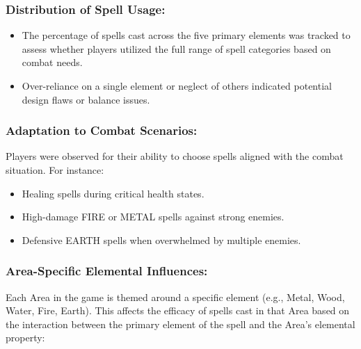 \documentclass[10pt,twocolumn]{article}
\begin{document}
\subsubsection{Distribution of Spell Usage:}

\begin{itemize}
    \item The percentage of spells cast across the five primary elements was tracked to assess whether players utilized the full range of spell categories based on combat needs.
    \item Over-reliance on a single element or neglect of others indicated potential design flaws or balance issues.
\end{itemize}

\subsubsection{Adaptation to Combat Scenarios:}
Players were observed for their ability to choose spells aligned with the combat situation. For instance:
\begin{itemize}
    \item Healing spells during critical health states.
    \item High-damage FIRE or METAL spells against strong enemies.
    \item Defensive EARTH spells when overwhelmed by multiple enemies.
\end{itemize}

\subsubsection{Area-Specific Elemental Influences:}
Each Area in the game is themed around a specific element (e.g., Metal, Wood, Water, Fire, Earth). This affects the efficacy of spells cast in that Area based on the interaction between the primary element of the spell and the Area's elemental property:
\end{document}
